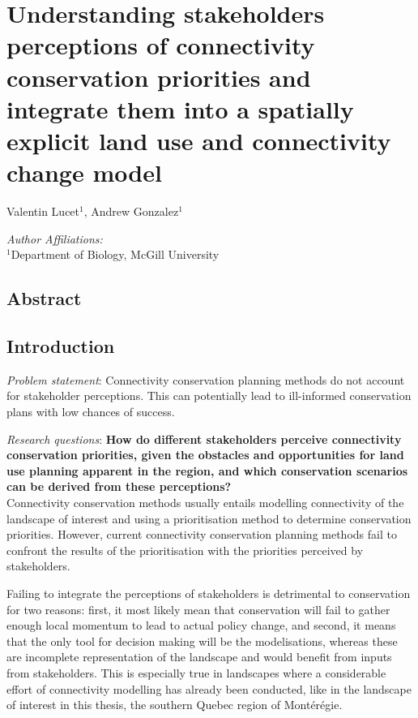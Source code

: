 \chapter{Understanding stakeholders perceptions of connectivity conservation priorities and integrate them into a spatially explicit land use and connectivity change model}
\begin{center}
{Valentin Lucet$^{1}$, Andrew Gonzalez$^{1}$}\\
\end{center}
\textit{Author Affiliations:}\\
\normalsize{$^{1}$Department of Biology, McGill University}\\

\section{Abstract}

\section{Introduction}

\textit{Problem statement}: Connectivity conservation planning methods do not account for stakeholder perceptions. This can potentially lead to ill-informed conservation plans with low chances of success.

\textit{Research questions}: \textbf{How do different stakeholders perceive connectivity conservation priorities, given the obstacles and opportunities for land use planning apparent in the region, and which conservation scenarios can be derived from these perceptions?} \\

Connectivity conservation methods usually entails modelling connectivity of the landscape of interest and using a prioritisation method to determine conservation priorities. However, current connectivity conservation planning methods fail to confront the results of the prioritisation with the priorities perceived by stakeholders.

Failing to integrate the perceptions of stakeholders is detrimental to conservation for two reasons: first, it most likely mean that conservation will fail to gather enough local momentum to lead to actual policy change, and second, it means that the only tool for decision making will be the modelisations, whereas these are incomplete representation of the landscape and would benefit from inputs from stakeholders. This is especially true in landscapes where a considerable effort of connectivity modelling has already been conducted, like in the landscape of interest in this thesis, the southern Quebec region of Montérégie.

